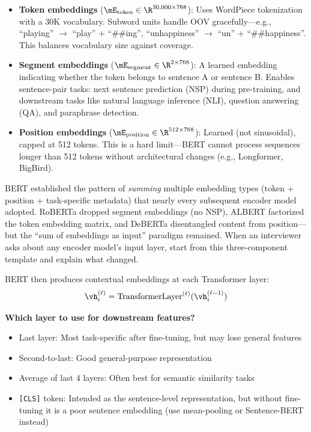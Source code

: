 \begin{itemize}
    \item \textbf{Token embeddings} ($\mE_{\text{token}} \in \R^{30{,}000 \times 768}$): Uses WordPiece tokenization with a 30K vocabulary. Subword units handle OOV gracefully---e.g., ``playing'' $\to$ ``play'' + ``\#\#ing'', ``unhappiness'' $\to$ ``un'' + ``\#\#happiness''. This balances vocabulary size against coverage.
    \item \textbf{Segment embeddings} ($\mE_{\text{segment}} \in \R^{2 \times 768}$): A learned embedding indicating whether the token belongs to sentence A or sentence B. Enables sentence-pair tasks: next sentence prediction (NSP) during pre-training, and downstream tasks like natural language inference (NLI), question answering (QA), and paraphrase detection.
    \item \textbf{Position embeddings} ($\mE_{\text{position}} \in \R^{512 \times 768}$): Learned (not sinusoidal), capped at 512 tokens. This is a hard limit---BERT cannot process sequences longer than 512 tokens without architectural changes (e.g., Longformer, BigBird).
\end{itemize}

\begin{keyinsight}
BERT established the pattern of \emph{summing} multiple embedding types (token + position + task-specific metadata) that nearly every subsequent encoder model adopted. RoBERTa dropped segment embeddings (no NSP), ALBERT factorized the token embedding matrix, and DeBERTa disentangled content from position---but the ``sum of embeddings as input'' paradigm remained. When an interviewer asks about any encoder model's input layer, start from this three-component template and explain what changed.
\end{keyinsight}

BERT then produces contextual embeddings at each Transformer layer:
\begin{equation}
\vh_i^{(\ell)} = \text{TransformerLayer}^{(\ell)}(\vh_i^{(\ell-1)})
\end{equation}

\textbf{Which layer to use for downstream features?}
\begin{itemize}
    \item Last layer: Most task-specific after fine-tuning, but may lose general features
    \item Second-to-last: Good general-purpose representation
    \item Average of last 4 layers: Often best for semantic similarity tasks
    \item \texttt{[CLS]} token: Intended as the sentence-level representation, but without fine-tuning it is a poor sentence embedding (use mean-pooling or Sentence-BERT instead)
\end{itemize}

